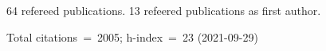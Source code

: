 64 refereed publications. 13 refeered publications as first author.

Total citations~=~2005; h-index~=~23 (2021-09-29)